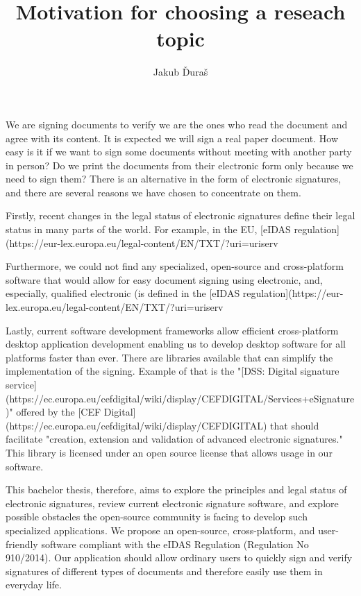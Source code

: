 \documentclass{article}
\begin{document}
\title{Motivation for choosing a reseach topic}
\author{Jakub Ďuraš}

\maketitle

We are signing documents to verify we are the ones who read the document and agree with its content. It is expected we will sign a real paper document. How easy is it if we want to sign some documents without meeting with another party in person? Do we print the documents from their electronic form only because we need to sign them? There is an alternative in the form of electronic signatures, and there are several reasons we have chosen to concentrate on them.

Firstly, recent changes in the legal status of electronic signatures define their legal status in many parts of the world. For example, in the EU, [eIDAS regulation](https://eur-lex.europa.eu/legal-content/EN/TXT/?uri=uriserv%

Furthermore, we could not find any specialized, open-source and cross-platform software that would allow for easy document signing using electronic, and, especially, qualified electronic (is defined in the [eIDAS regulation](https://eur-lex.europa.eu/legal-content/EN/TXT/?uri=uriserv%

Lastly, current software development frameworks allow efficient cross-platform desktop application development enabling us to develop desktop software for all platforms faster than ever. There are libraries available that can simplify the implementation of the signing. Example of that is the "[DSS: Digital signature service](https://ec.europa.eu/cefdigital/wiki/display/CEFDIGITAL/Services+eSignature)" offered by the [CEF Digital](https://ec.europa.eu/cefdigital/wiki/display/CEFDIGITAL) that should facilitate "creation, extension and validation of advanced electronic signatures." This library is licensed under an open source license that allows usage in our software.

This bachelor thesis, therefore, aims to explore the principles and legal status of electronic signatures, review current electronic signature software, and explore possible obstacles the open-source community is facing to develop such specialized applications. We propose an open-source, cross-platform, and user-friendly software compliant with the eIDAS Regulation (Regulation No 910/2014). Our application should allow ordinary users to quickly sign and verify signatures of different types of documents and therefore easily use them in everyday life.
\end{document}
